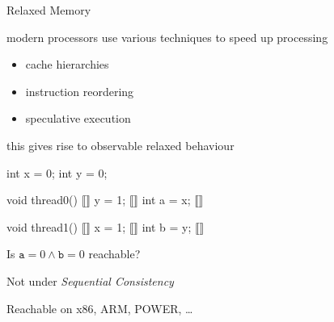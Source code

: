 \documentclass[aspectratio=169, fi]{paradise-slide}
\begin{document}
\begin{frame}[fragile]{Relaxed Memory}
  \begin{minipage}{0.47\textwidth}
    modern processors use various techniques to speed up processing
    \begin{itemize}
      \item cache hierarchies
      \item instruction reordering
      \item speculative execution
    \end{itemize}
    \pause

    this gives rise to observable relaxed behaviour
  \end{minipage}
  \hfill\pause
  \begin{minipage}{0.48\textwidth}
    \begin{cppcode}
      int x = 0;
      int y = 0;
    \end{cppcode}
    \begin{minipage}{0.49\textwidth}
      \begin{cppcode}
        void thread0()
        { ⟦⟧
          y = 1; ⟦⟧
          int a = x; ⟦⟧
        }
      \end{cppcode}
    \end{minipage}
    \hfill
    \begin{minipage}{0.49\textwidth}
      \begin{cppcode}
        void thread1()
        { ⟦⟧
          x = 1; ⟦⟧
          int b = y; ⟦⟧
        }
      \end{cppcode}
    \end{minipage}

    \centering\medskip
    Is $\texttt{a} = 0 \land \texttt{b} = 0$ reachable?
  \end{minipage}

  \bigskip\bigskip\pause
  \begin{minipage}[t]{0.48\textwidth}
    Not under \emph{Sequential Consistency}

  \end{minipage}
  \hfill\pause
  \begin{minipage}[t]{0.48\textwidth}
    Reachable on x86, ARM, POWER, …

  \end{minipage}
\end{frame}
\end{document}
